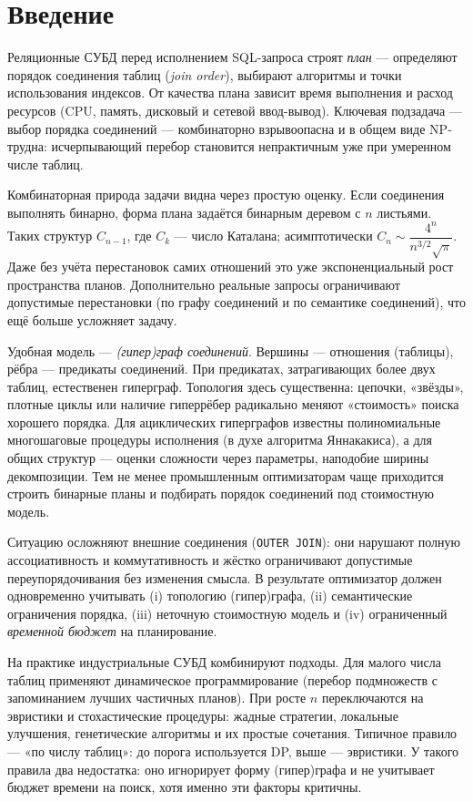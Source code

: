 \centering \section*{Введение}
\begin{flushleft}

Реляционные СУБД перед исполнением SQL-запроса строят \emph{план} — определяют порядок соединения таблиц (\textit{join order}), 
выбирают алгоритмы и точки использования индексов. От качества плана зависит время выполнения и расход ресурсов (CPU, память, 
дисковый и сетевой ввод-вывод). Ключевая подзадача — выбор порядка соединений — комбинаторно взрывоопасна и в общем виде 
NP-трудна: исчерпывающий перебор становится непрактичным уже при умеренном числе таблиц.

Комбинаторная природа задачи видна через простую оценку. Если соединения выполнять бинарно, форма плана задаётся бинарным деревом 
с \(n\) листьями. Таких структур \(C_{n-1}\), где \(C_k\) — число Каталана; асимптотически \(C_n \sim \dfrac{4^n}{n^{3/2}\sqrt{\pi}}\). 
Даже без учёта перестановок самих отношений это уже экспоненциальный рост пространства планов. Дополнительно реальные запросы 
ограничивают допустимые перестановки (по графу соединений и по семантике соединений), что ещё больше усложняет задачу.

Удобная модель — \emph{(гипер)граф соединений}. Вершины — отношения (таблицы), рёбра — предикаты соединений. При предикатах, 
затрагивающих более двух таблиц, естественен гиперграф. Топология здесь существенна: цепочки, «звёзды», плотные циклы или наличие 
гиперрёбер радикально меняют «стоимость» поиска хорошего порядка. Для ациклических гиперграфов известны полиномиальные 
многошаговые процедуры исполнения (в духе алгоритма Яннакакиса), а для общих структур — оценки сложности через параметры, наподобие 
ширины декомпозиции. Тем не менее промышленным оптимизаторам чаще приходится строить бинарные планы и подбирать порядок 
соединений под стоимостную модель.

Ситуацию осложняют внешние соединения (\texttt{OUTER JOIN}): они нарушают полную ассоциативность и коммутативность и жёстко 
ограничивают допустимые переупорядочивания без изменения смысла. В результате оптимизатор должен одновременно учитывать 
(i) топологию (гипер)графа, (ii) семантические ограничения порядка, (iii) неточную стоимостную модель и 
(iv) ограниченный \emph{временной бюджет} на планирование.

На практике индустриальные СУБД комбинируют подходы. Для малого числа таблиц применяют динамическое программирование (перебор 
подмножеств с запоминанием лучших частичных планов). При росте \(n\) переключаются на эвристики и стохастические процедуры: жадные 
стратегии, локальные улучшения, генетические алгоритмы и их простые сочетания. Типичное правило — «по числу таблиц»: до порога 
используется DP, выше — эвристики. У такого правила два недостатка: оно игнорирует форму (гипер)графа и не учитывает бюджет 
времени на поиск, хотя именно эти факторы критичны.


\end{flushleft}
